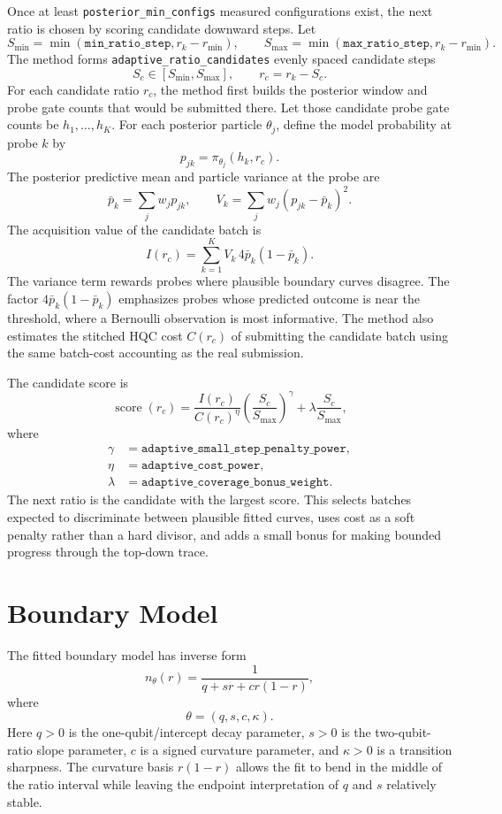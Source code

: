 \documentclass[11pt]{article}
\begin{document}
Once at least \texttt{posterior\_min\_configs} measured configurations exist,
the next ratio is chosen by scoring candidate downward steps. Let
\[
    S_{\min}=\min(\texttt{min\_ratio\_step}, r_k-r_{\min}),
    \qquad
    S_{\max}=\min(\texttt{max\_ratio\_step}, r_k-r_{\min}).
\]
The method forms \texttt{adaptive\_ratio\_candidates} evenly spaced candidate
steps
\[
    S_c \in [S_{\min},S_{\max}],
    \qquad
    r_c = r_k-S_c.
\]
For each candidate ratio $r_c$, the method first builds the posterior window
and probe gate counts that would be submitted there. Let those candidate probe
gate counts be $h_1,\ldots,h_K$. For each posterior particle $\theta_j$, define
the model probability at probe $k$ by
\[
    p_{jk} = \pi_{\theta_j}(h_k,r_c).
\]
The posterior predictive mean and particle variance at the probe are
\[
    \bar p_k = \sum_j w_j p_{jk},
    \qquad
    V_k = \sum_j w_j(p_{jk}-\bar p_k)^2.
\]
The acquisition value of the candidate batch is
\[
    I(r_c)
    =
    \sum_{k=1}^K
    V_k\,4\bar p_k(1-\bar p_k).
\]
The variance term rewards probes where plausible boundary curves disagree.
The factor $4\bar p_k(1-\bar p_k)$ emphasizes probes whose predicted outcome is
near the threshold, where a Bernoulli observation is most informative. The
method also estimates the stitched HQC cost $C(r_c)$ of submitting the candidate
batch using the same batch-cost accounting as the real submission.

The candidate score is
\[
    \operatorname{score}(r_c)
    =
    \frac{I(r_c)}{C(r_c)^\eta}
    \left(
        \frac{S_c}{S_{\max}}
    \right)^\gamma
    +
    \lambda
    \frac{S_c}{S_{\max}},
\]
where
\[
    \begin{aligned}
    \gamma &= \texttt{adaptive\_small\_step\_penalty\_power},\\
    \eta &= \texttt{adaptive\_cost\_power},\\
    \lambda &= \texttt{adaptive\_coverage\_bonus\_weight}.
    \end{aligned}
\]
The next ratio is the candidate with the largest score. This selects batches
expected to discriminate between plausible fitted curves, uses cost as a
soft penalty rather than a hard divisor, and adds a small bonus for making
bounded progress through the top-down trace.

\section{Boundary Model}

The fitted boundary model has inverse form
\[
    n_\theta(r) = \frac{1}{q+s r+c r(1-r)},
\]
where
\[
    \theta=(q,s,c,\kappa).
\]
Here $q>0$ is the one-qubit/intercept decay parameter, $s>0$ is the
two-qubit-ratio slope parameter, $c$ is a signed curvature parameter, and
$\kappa>0$ is a transition sharpness. The curvature basis $r(1-r)$ allows the
fit to bend in the middle of the ratio interval while leaving the endpoint
interpretation of $q$ and $s$ relatively stable.
\end{document}
